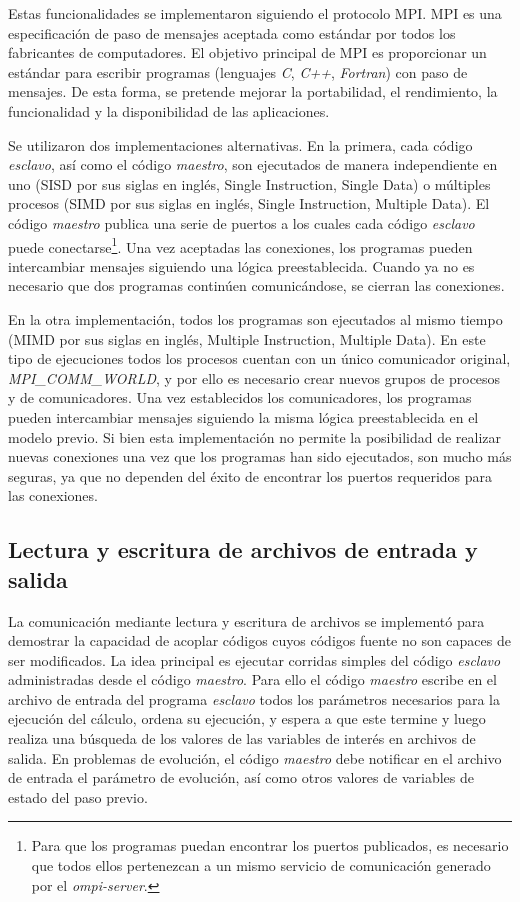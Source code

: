 Estas funcionalidades se implementaron siguiendo el protocolo MPI. 
MPI es una especificación de paso de mensajes aceptada como estándar
por todos los fabricantes de computadores. 
El objetivo principal de MPI es proporcionar un estándar para escribir
programas (lenguajes \textit{C}, \textit{C++}, \textit{Fortran}) con paso de mensajes. De esta forma, se
pretende mejorar la portabilidad, el rendimiento, la funcionalidad y
la disponibilidad de las aplicaciones.

Se utilizaron dos implementaciones alternativas.
En la primera, cada código \textit{esclavo}, así como el código \textit{maestro},
son ejecutados de manera independiente en uno (SISD por sus siglas en inglés, Single Instruction, Single Data) o múltiples procesos (SIMD por sus siglas en inglés, Single Instruction, Multiple Data).
El código \textit{maestro} publica una serie de puertos a los cuales cada código \textit{esclavo} puede conectarse\footnote{
Para que los programas puedan encontrar los puertos publicados, es necesario que todos ellos pertenezcan a un mismo servicio de comunicación generado por el \textit{ompi-server}.
}.
Una vez aceptadas las conexiones, los programas pueden intercambiar mensajes siguiendo una lógica preestablecida.
Cuando ya no es necesario que dos programas continúen comunicándose, se cierran las conexiones.

En la otra implementación, todos los programas son ejecutados al mismo tiempo (MIMD por sus siglas en inglés, Multiple Instruction, Multiple Data).
En este tipo de ejecuciones todos los procesos cuentan con un único comunicador original, \textit{MPI\_COMM\_WORLD}, y por ello es necesario crear nuevos grupos de procesos y de comunicadores.
Una vez establecidos los comunicadores, los programas pueden intercambiar mensajes siguiendo la misma lógica preestablecida en el modelo previo.
Si bien esta implementación no permite la posibilidad de realizar nuevas conexiones una vez que los programas han sido ejecutados,
son mucho más seguras, ya que no dependen del éxito de encontrar los puertos requeridos para las conexiones.

\subsection*{Lectura y escritura de archivos de entrada y salida}
\label{2:io}

La comunicación mediante lectura y escritura de archivos se implementó para demostrar la capacidad de acoplar códigos cuyos códigos fuente no son capaces de ser modificados.
La idea principal es ejecutar corridas simples del código \textit{esclavo} administradas desde el código \textit{maestro}.
Para ello el código \textit{maestro} escribe en el archivo de entrada del programa \textit{esclavo} todos los parámetros necesarios para la ejecución del cálculo,
ordena su ejecución, y espera a que este termine y luego realiza una búsqueda de los valores de las variables de interés en archivos de salida.
En problemas de evolución, el código \textit{maestro} debe notificar en el archivo de entrada el parámetro de evolución,
así como otros valores de variables de estado del paso previo.

